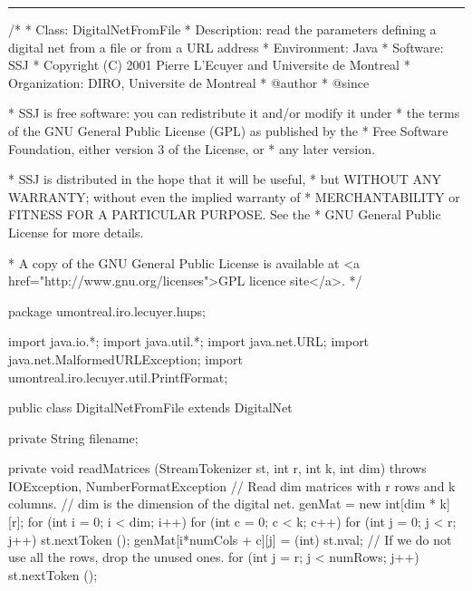 \bigskip\hrule\bigskip

\begin{code}
\begin{hide}
/*
 * Class:        DigitalNetFromFile
 * Description:  read the parameters defining a digital net from a file
                 or from a URL address
 * Environment:  Java
 * Software:     SSJ
 * Copyright (C) 2001  Pierre L'Ecuyer and Universite de Montreal
 * Organization: DIRO, Universite de Montreal
 * @author
 * @since

 * SSJ is free software: you can redistribute it and/or modify it under
 * the terms of the GNU General Public License (GPL) as published by the
 * Free Software Foundation, either version 3 of the License, or
 * any later version.

 * SSJ is distributed in the hope that it will be useful,
 * but WITHOUT ANY WARRANTY; without even the implied warranty of
 * MERCHANTABILITY or FITNESS FOR A PARTICULAR PURPOSE.  See the
 * GNU General Public License for more details.

 * A copy of the GNU General Public License is available at
   <a href="http://www.gnu.org/licenses">GPL licence site</a>.
 */
\end{hide}
package umontreal.iro.lecuyer.hups;\begin{hide}

import java.io.*;
import java.util.*;
import java.net.URL;
import java.net.MalformedURLException;
import umontreal.iro.lecuyer.util.PrintfFormat;
\end{hide}

public class DigitalNetFromFile extends DigitalNet \begin{hide} {
   private String filename;

   private void readMatrices (StreamTokenizer st,
                              int r, int k, int dim)
      throws IOException, NumberFormatException {
      // Read dim matrices with r rows and k columns.
      // dim is the dimension of the digital net.
      genMat = new int[dim * k][r];
      for (int i = 0; i < dim; i++)
         for (int c = 0; c < k; c++) {
             for (int j = 0; j < r; j++) {
                 st.nextToken ();
                 genMat[i*numCols + c][j]  = (int) st.nval;
             }
             // If we do not use all the rows, drop the unused ones.
             for (int j = r; j < numRows; j++) {
                 st.nextToken ();
             }
         }
   }


}
\end{hide}
\end{code}
